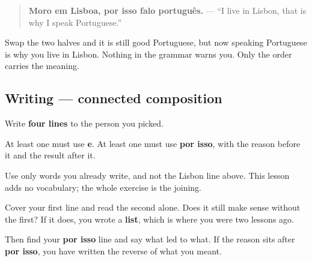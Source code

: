 \begin{quote}
\textbf{Moro em Lisboa, por isso falo português.} — \textquotedblleft{}I live in Lisbon, that is why I speak Portuguese.\textquotedblright{}
\end{quote}

Swap the two halves and it is still good Portuguese, but now speaking Portuguese is why you live in Lisbon. Nothing in the grammar warns you. Only the order carries the meaning.

\subsection*{Writing — connected composition}
Write \textbf{four lines} to the person you picked.

At least one must use \textbf{e}. At least one must use \textbf{por isso}, with the reason before it and the result after it.

Use only words you already write, and not the Lisbon line above. This lesson adds no vocabulary; the whole exercise is the joining.

\begin{tcolorbox}[breakable,colback=teal!4,colframe=teal!35!black,title={Before you move on}]
Cover your first line and read the second alone. Does it still make sense without the first? If it does, you wrote a \textbf{list}, which is where you were two lessons ago.

Then find your \textbf{por isso} line and say what led to what. If the reason sits after \textbf{por isso}, you have written the reverse of what you meant.
\end{tcolorbox}
